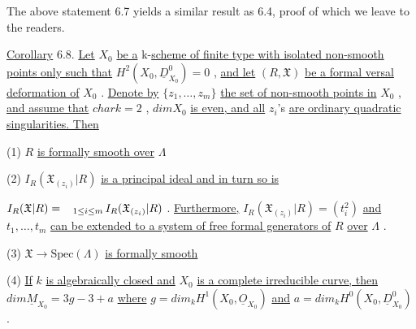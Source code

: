 The above statement 6.7 yields a similar result as 6.4, proof of which we leave to the readers.

\underline{Corollary} 6.8.  \underline{Let}  $X_0$  \underline{be a} k-\underline{scheme of finite type with isolated non-smooth points only such that}  $H^2(X_0, \underline{D}^0_{X_0}) = 0$  , \underline{and let}  $(R, \mathfrak{X})$  \underline{be a formal versal deformation of}  $X_0$  . \underline{Denote by}  $\{z_1, \ldots, z_m\}$  \underline{the set of non-smooth points in} $X_0$  , \underline{and assume that}  $char k = 2$  , $dim X_0$  \underline{is even, and all}  $z_i$'s  \underline{are ordinary quadratic singularities. Then}

(1)  $R$  \underline{is formally smooth over}  $\Lambda$

(2)  $I_R(\mathfrak{X}_{(z_i)}|R)$  \underline{is a principal ideal and in turn so is}

$I_R(\mathfrak{X}|R) = \mathop{\hphantom{\bigcap}}_{1 \leq i \leq m} I_R(\mathfrak{X}_{(z_i)}|R)$  . \underline{Furthermore,}  $I_R(\mathfrak{X}_{(z_i)}|R) = (t_i^2)$  \underline{and} $t_1, \ldots , t_m$  \underline{can be extended to a system of free formal generators of}  $R$  \underline{over} $\Lambda$  .

(3)  $\mathfrak{X} \to \mathrm{Spec}(\Lambda)$  \underline{is formally smooth}

(4)  \underline{If}  $k$  \underline{is algebraically closed and}  $X_0$  \underline{is a complete irreducible curve, then}  $dim \underline{M}_{X_0} = 3g - 3 + a$  \underline{where}  $g = dim_k H^1(X_0, \underline{O}_{X_0})$  \underline{and} $a = dim_k H^0(X_0, \underline{D}^0_{X_0})$  .
